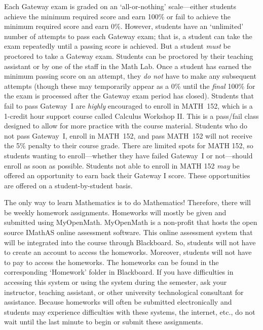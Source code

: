 \documentclass[11pt,letterpaper]{article}
\begin{document}
Each Gateway exam is graded on an `all-or-nothing' scale---either students achieve the minimum required score and earn 100\% or fail to achieve the minimum required score and earn 0\%. However, students have an `unlimited' number of attempts to pass each Gateway exam; that is, a student can take the exam repeatedly until a passing score is achieved. But a student \textit{must} be proctored to take a Gateway exam. Students can be proctored by their teaching assistant or by one of the staff in the Math Lab. Once a student has earned the minimum passing score on an attempt, they \textit{do not} have to make any subsequent attempts (though these may temporarily appear as a 0\% until the \textit{final} 100\% for the exam is processed after the Gateway exam period has closed). Students that fail to pass Gateway~I are \textit{highly} encouraged to enroll in MATH~152, which is a 1-credit hour support course called Calculus Workshop II. This is a pass/fail class designed to allow for more practice with the course material. Students who do not pass Gateway~I, enroll in MATH~152, and pass MATH~152 will not receive the 5\% penalty to their course grade. There are limited spots for MATH 152, so students wanting to enroll---whether they have failed Gateway~I or not---should enroll as soon as possible. Students not able to enroll in MATH 152 \textit{may} be offered an opportunity to earn back their Gateway I score. These opportunities are offered on a student-by-student basis.
\sectionbreak




The only way to learn Mathematics is to do Mathematics! Therefore, there will be weekly homework assignments. Homeworks will mostly be given and submitted using MyOpenMath. MyOpenMath is a non-profit that hosts the open source IMathAS online assessment software. This online assessment system that will be integrated into the course through Blackboard. So, students will not have to create an account to access the homeworks. Moreover, students will not have to pay to access the homeworks. The homeworks can be found in the corresponding `Homework' folder in Blackboard. If you have difficulties in accessing this system or using the system during the semester, ask your instructor, teaching assistant, or other university technological consultant for assistance. Because homeworks will often be submitted electronically and students may experience difficulties with these systems, the internet, etc., do not wait until the last minute to begin or submit these assignments. \pspace
\end{document}
